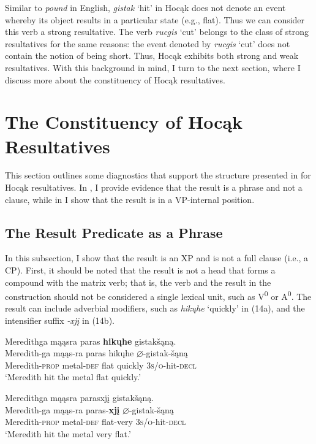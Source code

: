 \documentclass[output=paper]{LSP/langsci}
\begin{document}
Similar to \textit{pound} in English, \textit{gistak} `hit' in Hocąk does not denote an event whereby its object results in a particular state (e.g., flat). Thus we can consider this verb a strong resultative. The verb \textit{rucgis} `cut' belongs to the class of strong resultatives for the same reasons: the event denoted by \textit{rucgis} `cut' does not contain the notion of being short. Thus, Hocąk exhibits both strong and weak resultatives. With this background in mind, I turn to the next section, where I discuss more about the constituency of Hocąk resultatives.

\section{The Constituency of Hocąk Resultatives}

This section outlines some diagnostics that support the structure presented in  for Hocąk resultatives. In , I provide evidence that the result is a phrase and not a clause, while in  I show that the result is in a VP-internal position.

\subsection{The Result Predicate as a Phrase}

In this subsection, I show that the result is an XP and is not a full clause (i.e., a CP). First, it should be noted that the result is not a head that forms a compound with the matrix verb; that is, the verb and the result in the construction should not be considered a single lexical unit, such as V\textsuperscript{0} or A\textsuperscript{0}. The result can include adverbial modifiers, such as \textit{hikųhe} `quickly' in (14a), and the intensifier suffix \textit{-xjį} in (14b).

\begin{exe}
\ex
\begin{xlist}

\ex \glll Meredithga mąąsra paras \textbf{hikųhe} gistakšąną. \\
 Meredith-ga mąąs-ra paras hikųhe {$\varnothing$}-gistak-šąną\\
Meredith-\textsc{prop} metal-\textsc{def} flat quickly \textsc{3s/o}-hit-\textsc{decl}\\ 
\glt `Meredith hit the metal flat quickly.'


\ex \glll Meredithga mąąsra parasxjį gistakšąną.\\
 Meredith-ga mąąs-ra paras-\textbf{xjį} {$\varnothing$}-gistak-šąną\\
Meredith-\textsc{prop} metal-\textsc{def} flat-very  \textsc{3s/o}-hit-\textsc{decl}\\
\glt `Meredith hit the metal very flat.'

\end{xlist}
\end{exe}
\end{document}
